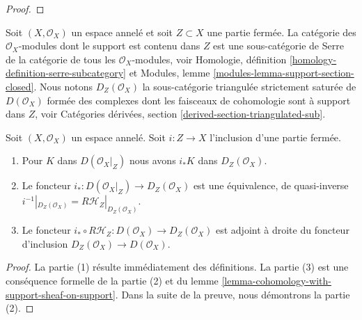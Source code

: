 {\begin{proof}
\end{proof}

\noindent
Soit $(X, \mathcal{O}_X)$ un espace annelé et soit $Z \subset X$ une partie fermée. La catégorie des $\mathcal{O}_X$-modules dont le support est contenu dans $Z$ est une sous-catégorie de Serre de la catégorie de tous les $\mathcal{O}_X$-modules, voir Homologie, définition \ref{homology-definition-serre-subcategory} et Modules, lemme \ref{modules-lemma-support-section-closed}. Nous notons $D_Z(\mathcal{O}_X)$ la sous-catégorie triangulée strictement saturée de $D(\mathcal{O}_X)$ formée des complexes dont les faisceaux de cohomologie sont à support dans $Z$, voir Catégories dérivées, section \ref{derived-section-triangulated-sub}.

\begin{lemma}

\label{lemma-complexes-with-support-on-closed}
Soit $(X, \mathcal{O}_X)$ un espace annelé. Soit $i : Z \to X$ l'inclusion d'une partie fermée.
\begin{enumerate}
\item Pour $K$ dans $D(\mathcal{O}_X|_Z)$ nous avons $i_*K$ dans $D_Z(\mathcal{O}_X)$.
\item Le foncteur $i_* : D(\mathcal{O}_X|_Z) \to D_Z(\mathcal{O}_X)$ est une équivalence, de quasi-inverse $i^{-1}|_{D_Z(\mathcal{O}_X)} = R\mathcal{H}_Z|_{D_Z(\mathcal{O}_X)}$.
\item Le foncteur $i_* \circ R\mathcal{H}_Z : D(\mathcal{O}_X) \to D_Z(\mathcal{O}_X)$ est adjoint à droite du foncteur d'inclusion $D_Z(\mathcal{O}_X) \to D(\mathcal{O}_X)$.
\end{enumerate}

\end{lemma}

\begin{proof}
La partie (1) résulte immédiatement des définitions. La partie (3) est une conséquence formelle de la partie (2) et du lemme \ref{lemma-cohomology-with-support-sheaf-on-support}. Dans la suite de la preuve, nous démontrons la partie (2).

\medskip\noindent


\end{proof}}

